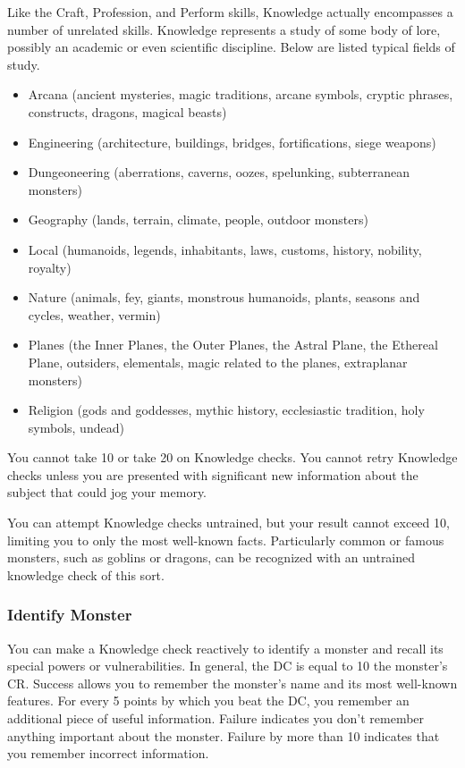 Like the Craft, Profession, and Perform skills, Knowledge actually encompasses a number of unrelated skills. Knowledge represents a study of some body of lore, possibly an academic or even scientific discipline. Below are listed typical fields of study.
\begin{itemize}
\item Arcana (ancient mysteries, magic traditions, arcane symbols,
cryptic phrases, constructs, dragons, magical beasts)
\item Engineering (architecture, buildings, bridges, fortifications, siege weapons)
\item Dungeoneering (aberrations, caverns, oozes, spelunking, subterranean monsters)
\item Geography (lands, terrain, climate, people, outdoor monsters)
\item Local (humanoids, legends, inhabitants, laws, customs, history, nobility, royalty)
\item Nature (animals, fey, giants, monstrous humanoids, plants, seasons and cycles, weather, vermin)
\item Planes (the Inner Planes, the Outer Planes, the Astral Plane,
the Ethereal Plane, outsiders, elementals, magic related to the planes, extraplanar monsters)
\item Religion (gods and goddesses, mythic history, ecclesiastic tradition, holy symbols, undead)
\end{itemize}

You cannot take 10 or take 20 on Knowledge checks. You cannot retry Knowledge checks unless you are presented with significant new information about the subject that could jog your memory.

You can attempt Knowledge checks untrained, but your result cannot exceed 10, limiting you to only the most well-known facts. Particularly common or famous monsters, such as goblins or dragons, can be recognized with an untrained knowledge check of this sort. 

\subsubsection{Identify Monster}
You can make a Knowledge check reactively to identify a monster and recall its special powers or vulnerabilities. In general, the DC is equal to 10 \add the monster's CR. Success allows you to remember the monster's name and its most well-known features. For every 5 points by which you beat the DC, you remember an additional piece of useful information. Failure indicates you don't remember anything important about the monster. Failure by more than 10 indicates that you remember incorrect information.

